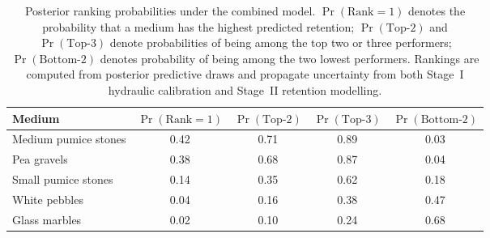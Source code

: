 \begin{table}[H]
\caption{Posterior ranking probabilities under the combined model. $\Pr(\mathrm{Rank}=1)$ denotes the probability that a medium has the highest predicted retention; $\Pr(\mathrm{Top\text{-}2})$ and $\Pr(\mathrm{Top\text{-}3})$ denote probabilities of being among the top two or three performers; $\Pr(\mathrm{Bottom\text{-}2})$ denotes probability of being among the two lowest performers. Rankings are computed from posterior predictive draws and propagate uncertainty from both Stage~I hydraulic calibration and Stage~II retention modelling.}
\label{tab:posterior_rankings}
\centering
\begin{tabular}{lcccc}
\toprule
Medium & $\Pr(\mathrm{Rank}=1)$ & $\Pr(\mathrm{Top\text{-}2})$ & $\Pr(\mathrm{Top\text{-}3})$ & $\Pr(\mathrm{Bottom\text{-}2})$ \\
\midrule
Medium pumice stones & 0.42 & 0.71 & 0.89 & 0.03 \\
Pea gravels & 0.38 & 0.68 & 0.87 & 0.04 \\
Small pumice stones & 0.14 & 0.35 & 0.62 & 0.18 \\
White pebbles & 0.04 & 0.16 & 0.38 & 0.47 \\
Glass marbles & 0.02 & 0.10 & 0.24 & 0.68 \\
\bottomrule
\end{tabular}
\end{table}
